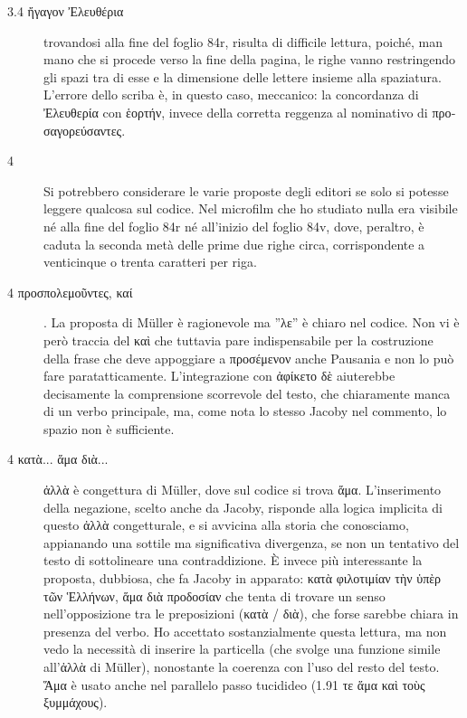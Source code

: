 \begin{description}
\item[3.4 \textgreek{ἤγαγον Ἐλευθέρια}] trovandosi alla fine del foglio 84r, risulta di difficile lettura, poiché, man mano che si procede verso la fine della pagina, le righe vanno restringendo gli spazi tra di esse e la dimensione delle lettere insieme alla spaziatura. L'errore dello scriba è, in questo caso, meccanico: la concordanza di \textgreek{Ἐλευθερία} con \textgreek{ἑορτήν}, invece della corretta reggenza al nominativo di \textgreek{προσαγορεύσαντες}.
\item[4]  Si potrebbero considerare le varie proposte degli editori se solo si potesse leggere qualcosa sul codice. Nel microfilm che ho studiato nulla era visibile né alla fine del foglio 84r né all'inizio del foglio 84v, dove, peraltro, è caduta la seconda metà delle prime due righe circa, corrispondente a  venticinque o trenta caratteri per riga.
\item[4 \textgreek{προσπολεμοῦντες, καί}].  La proposta di Müller è ragionevole ma ''\textgreek{λε}'' è chiaro nel codice. Non vi è però traccia del \textgreek{καὶ} che tuttavia pare indispensabile per la costruzione della frase che deve appoggiare a \textgreek{προσέμενον} anche Pausania e non lo può fare paratatticamente. L'integrazione con \textgreek{ἀφίκετο δὲ} aiuterebbe decisamente la comprensione scorrevole del testo, che chiaramente manca di un verbo principale, ma, come nota lo stesso Jacoby nel commento, lo spazio non è sufficiente.  
\item[4 \textgreek{κατὰ... ἅμα διὰ...}] \textgreek{ἀλλὰ} è congettura di Müller, dove sul codice si trova \textgreek{ἅμα}. L'inserimento della negazione, scelto anche da Jacoby, risponde alla logica implicita di questo \textgreek{ἀλλὰ} congetturale, e si avvicina alla storia che conosciamo, appianando una sottile ma significativa divergenza, se non un tentativo del testo di sottolineare una contraddizione. È invece più interessante la proposta, dubbiosa, che fa Jacoby in apparato: \textgreek{κατὰ φιλοτιμίαν τὴν ὑπὲρ τῶν Ἑλλήνων, ἅμα  διὰ προδοσίαν} che tenta di trovare un senso nell'opposizione tra le preposizioni (\textgreek{κατὰ} / \textgreek{διὰ}), che forse sarebbe chiara in presenza del verbo. Ho accettato sostanzialmente questa lettura, ma non vedo la necessità di inserire la particella \textgreek{} (che svolge una funzione simile all'\textgreek{ἀλλὰ} di Müller), nonostante la coerenza con l'uso del resto del testo. \textgreek{ Ἅμα} è usato anche nel parallelo passo tucidideo (1.91 \textgreek{τε ἅμα καὶ τοὺς ξυμμάχους}).

\end{description}

